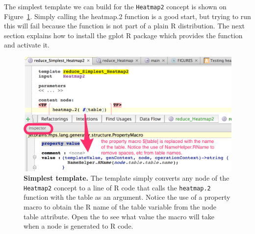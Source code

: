 The simplest template we can build for the \texttt{Heatmap2} concept is shown on Figure~\ref{fig:SimplestTemplate}. Simply calling the heatmap.2 function is a good start, but trying to run this will fail because the function is not part of a plain R distribution. The next section explains how to install the gplot R package which provides the function and activate it. 

\begin{figure}[h!tbp]
  \centering
  \includegraphics[width=\figWidthWide]{figures/SimplestTemplate.png}
\caption[Simplest template.]{\textbf{Simplest template.} The template simply converts any node of the \texttt{Heatmap2} concept to a line of R code that calls the \texttt{heatmap.2} function with the table as an argument. Notice the use of a property macro to obtain the R name of the table variable from the node table attribute. Open the \inspectorTabIcon{} to see what value the macro will take when a node is generated to R code.}
\label{fig:SimplestTemplate}
\end{figure}

